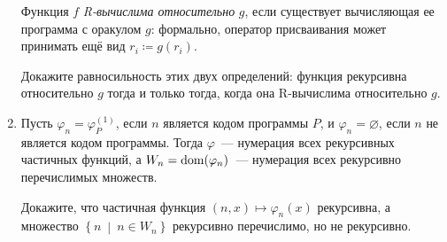 \documentclass[a4paper,11pt]{article}
\begin{document}
\begin{enumerate}
Функция $f$ {\it R-вычислима относительно} $g$, если существует вычисляющая ее программа с оракулом $g$: формально, оператор присваивания может принимать ещё вид \(r_i \coloneqq g(r_i)\).

Докажите равносильность этих двух определений: функция рекурсивна относительно \(g\) тогда и только тогда, когда она R-вычислима относительно \(g\).

	\item Пусть $\varphi_n=\varphi^{(1)}_P$, если $n$ является кодом программы $P$, и $\varphi_n=\varnothing$, если $n$ не является кодом программы. Тогда $\varphi$~— нумерация всех рекурсивных частичных функций, а $W_n=\text{dom}\lr*{\varphi_n}$~— нумерация всех рекурсивно перечислимых множеств.

Докажите, что частичная функция $(n,x)\mapsto\varphi_n(x)$ рекурсивна, а множество $\left\{n\:\middle\vert\: n\in W_n\right\}$ рекурсивно перечислимо, но не рекурсивно.

\end{enumerate}
\end{document}
